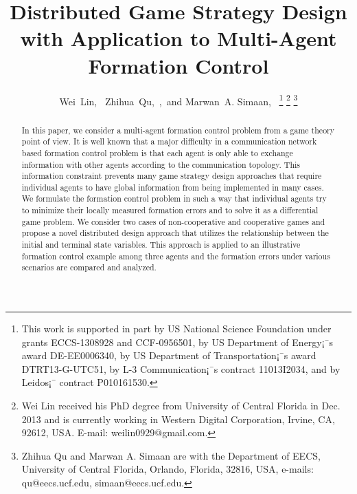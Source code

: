 \documentclass[letterpaper, 10 pt, conference,onecolumn]{ieeeconf}  %
\begin{document}
\title{\LARGE \bf
Distributed Game Strategy Design with Application to Multi-Agent Formation Control}


\author{Wei~Lin,~
        Zhihua~Qu,~,~and
        Marwan~A. Simaan,~
\thanks{This work is supported in part by US National Science Foundation under grants ECCS-1308928 and CCF-0956501, by US Department of Energy¡¯s award DE-EE0006340, by US Department of Transportation¡¯s award DTRT13-G-UTC51, by L-3 Communication¡¯s contract 11013I2034, and by Leidos¡¯ contract P010161530.}%
\thanks{Wei Lin received his PhD degree from University of Central Florida in Dec. 2013 and is currently working in Western Digital Corporation, Irvine, CA, 92612, USA. E-mail: weilin0929@gmail.com.}
\thanks{Zhihua Qu and Marwan A. Simaan are with the Department of EECS, University of Central Florida, Orlando, Florida, 32816, USA, e-mails: qu@eecs.ucf.edu, simaan@eecs.ucf.edu.}%
%
}



\maketitle

\IEEEpeerreviewmaketitle

\begin{abstract}
In this paper, we consider {a} multi-agent formation control problem from {a} game {theory} point of view. It is well known that a major difficulty in a communication network based formation control problem is that each agent is only able to exchange information {with other agents} according to the communication topology. This information constraint prevents many game strategy design approaches that require individual agents to have global information from being implemented in many cases. We formulate the formation control problem {in such a way that individual agents try to minimize their locally measured formation errors and {to} solve it as a differential game problem}. We consider two cases of non-cooperative and cooperative games and {propose} a novel distributed design approach that utilizes the relationship between the initial and terminal state variables. This approach is applied to an illustrative formation control example among three agents and the formation errors under various scenarios are compared and analyzed.
\end{abstract}
\end{document}
